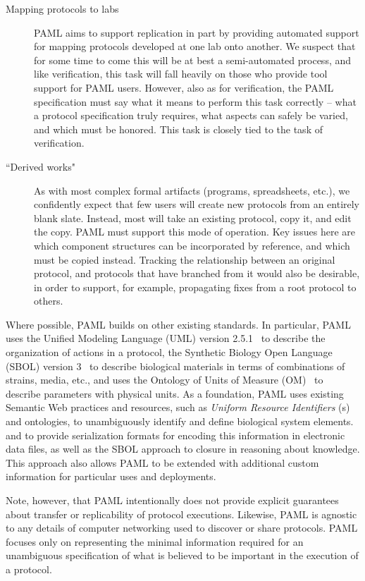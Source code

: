 \begin{description}
\item[Mapping protocols to labs] PAML aims to support replication in part by providing automated support for mapping protocols developed at one lab onto another.  We suspect that for some time to come this will be at best a semi-automated process, and like verification, this task will fall heavily on those who provide tool support for PAML users.  However, also as for verification, the PAML specification must say what it means to perform this task correctly -- what a protocol specification truly requires, what aspects can safely be varied, and which must be honored.  This task is closely tied to the task of verification.
\item[``Derived works"] As with most complex formal artifacts (programs, spreadsheets, etc.), we confidently expect that few users will create new protocols from an entirely blank slate.  Instead, most will take an existing protocol, copy it, and edit the copy.  PAML must support this mode of operation.  Key issues here are which component structures can be incorporated by reference, and which must be copied instead.  Tracking the relationship between an original protocol, and protocols that have branched from it would also be desirable, in order to support, for example, propagating fixes from a root protocol to others.
\end{description}

Where possible, PAML builds on other existing standards.
In particular, PAML uses the Unified Modeling Language (UML) version 2.5.1~\citep{uml251} to describe the organization of actions in a protocol, the Synthetic Biology Open Language (SBOL) version 3~\citep{SBOL3} to describe biological materials in terms of combinations of strains, media, etc., and uses the Ontology of Units of Measure (OM)~\citep{om2} to describe parameters with physical units.
As a foundation, PAML uses existing Semantic Web practices and resources, such as \emph{Uniform Resource Identifiers} (s) and ontologies, to unambiguously identify and define biological system elements.
and to provide serialization formats for encoding this information in electronic data files, as well as the SBOL approach to closure in reasoning about knowledge.
This approach also allows PAML to be extended with additional custom information for particular uses and deployments.

Note, however, that PAML intentionally does not provide explicit guarantees about transfer or replicability of protocol executions. 
Likewise, PAML is agnostic to any details of computer networking used to discover or share protocols.
PAML focuses only on representing the minimal information required for an unambiguous specification of what is believed to be important in the execution of a protocol.


